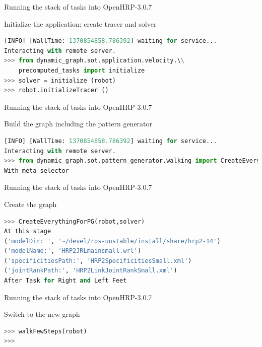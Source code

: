 \begin{frame}[fragile]{Running the stack of tasks into OpenHRP-3.0.7}
\begin{block}{Initialize the application: create tracer and solver}
  \begin{lstlisting}[language=Python,basicstyle=\small,backgroundcolor=\color{AliceBlue}, frame=single,showlines=false]
[INFO] [WallTime: 1370854858.786392] waiting for service...
Interacting with remote server.
>>> from dynamic_graph.sot.application.velocity.\\
    precomputed_tasks import initialize
>>> solver = initialize (robot)
>>> robot.initializeTracer ()
  \end{lstlisting}
\end{block}
\end{frame}

\begin{frame}[fragile]{Running the stack of tasks into OpenHRP-3.0.7}
\begin{block}{Build the graph including the pattern generator}
  \begin{lstlisting}[language=Python,basicstyle=\small,backgroundcolor=\color{AliceBlue}, frame=single,showlines=false]
[INFO] [WallTime: 1370854858.786392] waiting for service...
Interacting with remote server.
>>> from dynamic_graph.sot.pattern_generator.walking import CreateEverythingForPG, walkFewSteps
With meta selector
  \end{lstlisting}
\end{block}
\end{frame}


\begin{frame}[fragile]{Running the stack of tasks into OpenHRP-3.0.7}
\begin{block}{Create the graph}
  \begin{lstlisting}[language=Python,basicstyle=\small,backgroundcolor=\color{AliceBlue}, frame=single,showlines=false]
>>> CreateEverythingForPG(robot,solver)
At this stage
('modelDir: ', '~/devel/ros-unstable/install/share/hrp2-14')
('modelName:', 'HRP2JRLmainsmall.wrl')
('specificitiesPath:', 'HRP2SpecificitiesSmall.xml')
('jointRankPath:', 'HRP2LinkJointRankSmall.xml')
After Task for Right and Left Feet
  \end{lstlisting}
\end{block}
\end{frame}


\begin{frame}[fragile]{Running the stack of tasks into OpenHRP-3.0.7}
  \begin{block}{Switch to the new graph}       
    \begin{lstlisting}[language=Python,basicstyle=\small,backgroundcolor=\color{AliceBlue}, frame=single,showlines=false]
>>> walkFewSteps(robot)
>>> 
    \end{lstlisting}
  \end{block}
\end{frame}

